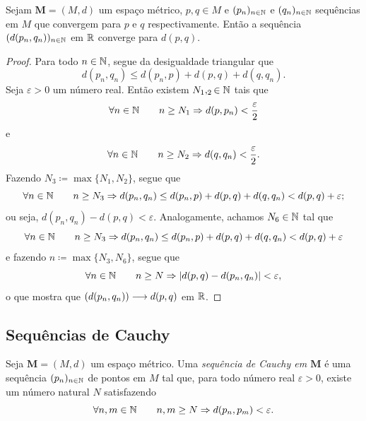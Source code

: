 \begin{prop}
	Sejam $\bm M = (M,d)$ um espaço métrico, $p,q \in M$ e $(p_n)_{n \in \mathbb{N}}$ e $(q_n)_{n \in \mathbb{N}}$ sequências em $M$ que convergem para $p$ e $q$ respectivamente. Então a sequência $(d(p_n,q_n))_{n \in \mathbb{N}}$ em $\mathbb{R}$ converge para $d(p,q)$.
\end{prop}
\begin{proof}
	Para todo $n \in \mathbb{N}$, segue da desigualdade triangular que
	\begin{equation*}
	d(p_n,q_n) \leq d(p_n,p) + d(p,q) + d(q,q_n).
	\end{equation*}
Seja $\varepsilon > 0$ um número real. Então existem $N_1,_2 \in \mathbb{N}$ tais que
	\begin{equation*}
	\forall n \in \mathbb{N} \qquad n \geq N_1 \Rightarrow d(p,p_n) < \frac{\varepsilon}{2}
	\end{equation*}
e
	\begin{equation*}
	\forall n \in \mathbb{N} \qquad n \geq N_2 \Rightarrow d(q,q_n) < \frac{\varepsilon}{2}.
	\end{equation*}
Fazendo $N_3 \coloneqq \max\{N_1,N_2\}$, segue que
	\begin{equation*}
	\forall n \in \mathbb{N} \qquad n \geq N_3 \Rightarrow d(p_n,q_n) \leq d(p_n,p) + d(p,q) + d(q,q_n) < d(p,q) + \varepsilon;
	\end{equation*}
ou seja, $d(p_n,q_n) - d(p,q) < \varepsilon$. Analogamente, achamos $N_6 \in \mathbb{N}$ tal que
	\begin{equation*}
	\forall n \in \mathbb{N} \qquad n \geq N_3 \Rightarrow d(p_n,q_n) \leq d(p_n,p) + d(p,q) + d(q,q_n) < d(p,q) + \varepsilon
	\end{equation*}
e fazendo $n \coloneqq \max\{N_3,N_6\}$, segue que
	\begin{equation*}
	\forall n \in \mathbb{N} \qquad n \geq N \Rightarrow |d(p,q) - d(p_n,q_n)| < \varepsilon,
	\end{equation*}
o que mostra que $(d(p_n,q_n)) \longrightarrow d(p,q)$ em $\mathbb{R}$.
	
\end{proof}


\subsection{Sequências de Cauchy}

\begin{defi}
	Seja $\bm M = (M,d)$ um espaço métrico. Uma \emph{sequência de Cauchy em $\bm M$} é uma sequência $(p_n)_{n \in \mathbb{N}}$ de pontos em $M$ tal que, para todo número real $\varepsilon > 0$, existe um número natural $N$ satisfazendo
	\begin{equation*}
	\forall n,m \in \mathbb{N} \qquad n,m \geq N \Rightarrow d(p_n,p_m) < \varepsilon.
	\end{equation*}
\end{defi}

